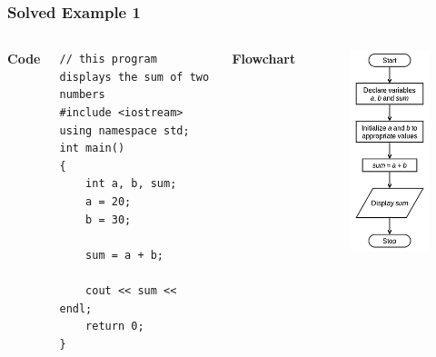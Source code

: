 \documentclass{beamer}
\begin{document}
\begin{frame}[fragile]
    \frametitle{Solved Example 1}
    \begin{columns}
    \textbf{Code}
    \lstset{style=mystyle}
    \begin{lstlisting}
// this program displays the sum of two numbers
#include <iostream>
using namespace std;
int main()
{
    int a, b, sum;
    a = 20;
    b = 30;

    sum = a + b;

    cout << sum << endl;
    return 0;
}\end{lstlisting}
    \textbf{Flowchart}
    \begin{figure}
        \centering
        \includegraphics[scale=0.55]{p1flow}
    \end{figure}
    \end{columns}
\end{frame}
\end{document}
